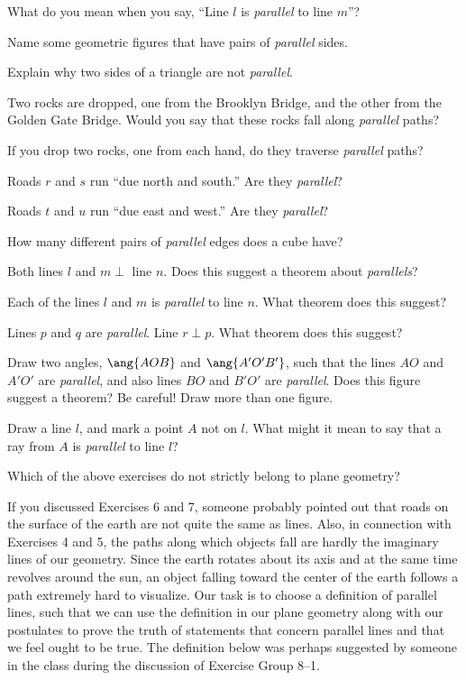 \documentclass[11pt]{book}
\theoremstyle{bkplain}
\theoremstyle{XIplainnote}
\theoremstyle{bkplain}
\theoremstyle{bkplain}
\begin{document}
\begin{exercisecols}
\begin{exlist}
\item What do you mean when you say, ``Line $l$ is \emph{parallel} to line
  $m$''?
\item Name some geometric figures that have pairs of \emph{parallel} sides.
\item Explain why two sides of a triangle are not \emph{parallel}.
\item Two rocks are dropped, one from the Brooklyn Bridge, and the other from
  the Golden Gate Bridge. Would you say that these rocks fall along
  \emph{parallel} paths?
\item If you drop two rocks, one from each hand, do they traverse
  \emph{parallel} paths?
\item Roads $r$ and $s$ run ``due north and south.'' Are they \emph{parallel}?
\item Roads $t$ and $u$ run ``due east and west.'' Are they \emph{parallel}?
\item How many different pairs of \emph{parallel} edges does a cube have?
\item Both lines $l$ and $m \perp$ line $n$. Does this suggest a theorem about
  \emph{parallels}?
\item Each of the lines $l$ and $m$ is \emph{parallel} to line $n$. What
  theorem does this suggest?
\item Lines $p$ and $q$ are \emph{parallel}. Line $r \perp p$. What theorem
  does this suggest?
\item Draw two angles, $\ang{AOB}$ and $\ang{A'O'B'}$, such that the lines
  $AO$ and $A'O'$ are \emph{parallel}, and also lines $BO$ and $B'O'$ are
  \emph{parallel}. Does this figure suggest a theorem? Be careful! Draw more
  than one figure.
\item Draw a line $l$, and mark a point $A$ not on $l$. What might it mean to
  say that a ray from $A$ is \emph{parallel} to line $l$?
\item Which of the above exercises do not strictly belong to plane geometry?
\end{exlist}
\end{exercisecols}

If you discussed Exercises 6 and 7, someone probably pointed out that roads on
the surface of the earth are not quite the same as lines. Also, in connection
with Exercises 4 and 5, the paths along which objects fall are hardly the
imaginary lines of our geometry. Since the earth rotates about its axis and at
the same time revolves around the sun, an object falling toward the center of
the earth follows a path extremely hard to visualize. Our task is to choose a
definition of parallel lines, such that we can use the definition in our plane
geometry along with our postulates to prove the truth of statements that
concern parallel lines and that we feel ought to be true. The definition below
was perhaps suggested by someone in the class during the discussion of
Exercise Group 8--1.
\end{document}
